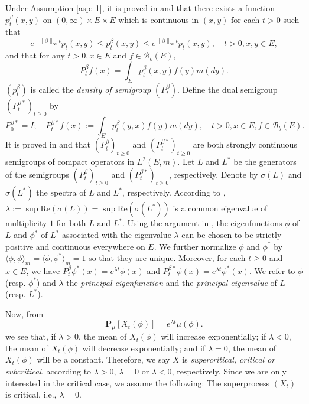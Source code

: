 \documentclass[12pt, a4paper]{amsart}
\theoremstyle{definition}
\newenvironment{asp}[1]{\renewcommand\theinnerasp{#1}\innerasp}{\endinnerasp}
\numberwithin{equation}{section}
\begin{document}
	Under Assumption \ref{asp: 1}, it is proved in \cite{RenSongZhang2015Limit} and \cite{RenSongZhang2017Central} that there exists a function $p^\beta_t(x,y)$ on $(0,\infty) \times E \times E$ which is continuous in $(x,y)$ for each $t>0$ such that
\[
	e^{-\|\beta\|_\infty t} p_t(x,y)
	\leq p^{\beta}_t(x,y)
	\leq e^{\|\beta\|_\infty t} p_t(x,y),
	\quad t>0, x, y\in E,
\]
	and that for any $t>0, x\in E$ and $f \in \mathscr B_b(E)$,
\[
	P^\beta_t f(x)
	= \int_E p_t^\beta (x,y) f(y) m(dy).
\]
	 $(p^\beta_t)$ is called the
	\emph{density of semigroup $(P^\beta_t)$}.
	Define the dual semigroup $(P^{\beta *}_t)_{t \geq 0}$ by
\[
	P^{\beta *}_0 = I;
	\quad P^{\beta *}_t f(x)
	:= \int_E p^\beta_t (y,x) f(y) m(dy),
	\quad t>0, x\in E, f\in \mathscr B_b(E).
\]
	It is proved in \cite{RenSongZhang2015Limit} and \cite{RenSongZhang2017Central} that 
	$(P^\beta_t)_{t \geq 0}$ and $(P^{\beta *}_t)_{t \geq 0}$
	are both strongly continuous semigroups of compact operators in $L^2(E,m)$.
	Let $L$ and $L^*$ be the generators of the semigroups $(P^\beta_t)_{t \geq 0}$ and $(P^{\beta *}_t)_{t \geq 0}$, respectively.
	Denote by $\sigma(L)$ and $\sigma(L^*)$ the spectra of $L$ and $L^*$, respectively.
	According to \cite[Theorem V.6.6.]{Schaefer1974Banach}, $\lambda := \sup \text{Re}(\sigma(L)) = \sup \text{Re}(\sigma(L^*))$ is a common eigenvalue of multiplicity $1$ for both $L$ and $L^*$.
	Using the argument in \cite{RenSongZhang2015Limit}, the eigenfunctions $\phi$ of $L$ and $\phi^*$ of $L^*$ associated with the eigenvalue $\lambda$ can be chosen to be strictly positive and continuous everywhere on $E$.
	We further normalize $\phi$ and $\phi^*$ by $\langle\phi, \phi\rangle_m = \langle\phi,\phi^*\rangle_m = 1$ so that they are unique.
	Moreover, for each 
	$t\geq 0$ and $x\in E$,
	we have $P^\beta_t \phi^*(x) = e^{\lambda t} \phi(x)$ and $P^{\beta *}_t \phi(x) = e^{\lambda t} \phi^*(x)$.
	We refer to $\phi$ (resp. $\phi^*$) and $\lambda$ the \emph{principal eigenfunction} and the \emph{principal eigenvalue} of $L$ (resp. $L^*$).
	
	Now, from
\[
	\mathbf P_\mu[X_t(\phi)]
	= e^{\lambda t} \mu(\phi).
\]
	we see that, if $\lambda > 0$, the mean of $X_t(\phi)$ will increase exponentially; if $\lambda < 0$, the mean of $X_t(\phi)$ will decrease exponentially; and if $\lambda = 0$, the mean of $X_t(\phi)$ will be a constant.
	Therefore, we say $X$ is \emph{supercritical, critical or subcritical}, according to $\lambda > 0$, $\lambda = 0$ or $\lambda < 0$, respectively.
	Since we are only interested in the critical case, we assume the following:
\begin{asp}{2} \label{asp: 2}
	The superprocess $(X_t)$ is critical, i.e., $\lambda = 0$.
\end{asp}
\end{document}
